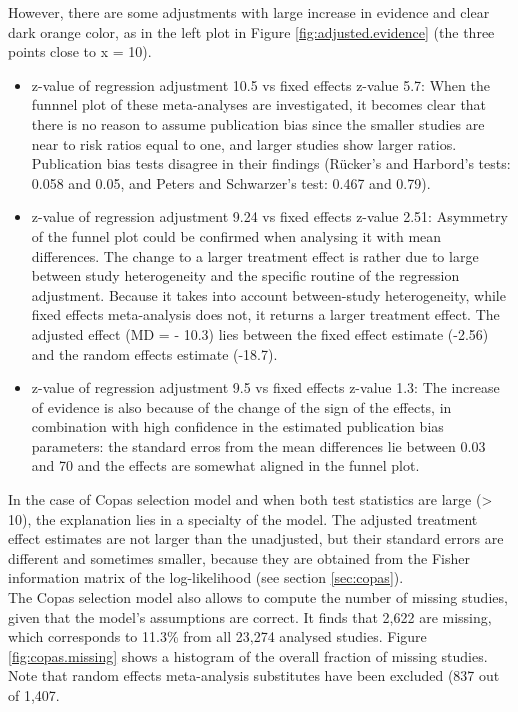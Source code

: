 \documentclass[11pt,a4paper,twoside]{book}\usepackage[]{graphicx}\usepackage[]{color}
\begin{document}
However, there are some adjustments with large increase in evidence and clear dark orange color, as in the left plot in Figure \ref{fig:adjusted.evidence} (the three points close to x = 10). 
\begin{itemize}
\item z-value of regression adjustment 10.5 vs fixed effects z-value 5.7: When the funnnel plot of these meta-analyses are investigated, it becomes clear that there is no reason to assume publication bias since the smaller studies are near to risk ratios equal to one, and larger studies show larger ratios. Publication bias tests disagree in their findings (R\"ucker's and Harbord's tests: 0.058 and 0.05, and Peters and Schwarzer's test: 0.467 and 0.79).
\item z-value of regression adjustment 9.24 vs fixed effects z-value 2.51: Asymmetry of the funnel plot could be confirmed when analysing it with mean differences. The change to a larger treatment effect is rather due to large between study heterogeneity and the specific routine of the regression adjustment. Because it takes into account between-study heterogeneity, while fixed effects meta-analysis does not, it returns a larger treatment effect. The adjusted effect (MD = - 10.3) lies between the fixed effect estimate (-2.56) and the random effects estimate (-18.7).
\item z-value of regression adjustment 9.5 vs fixed effects z-value 1.3: The increase of evidence is also because of the change of the sign of the effects, in combination with high confidence in the estimated publication bias parameters: the standard erros from the mean differences lie between 0.03 and 70 and the effects are somewhat aligned in the funnel plot. 
\end{itemize}
In the case of Copas selection model and when both test statistics are large (> 10), the explanation lies in a specialty of the model. The adjusted treatment effect estimates are not larger than the unadjusted, but their standard errors are different and sometimes smaller, because they are obtained from the Fisher information matrix of the log-likelihood (see section \ref{sec:copas}). \\
The Copas selection model also allows to compute the number of missing studies, given that the model's assumptions are correct. It finds that 2,622 are missing, which corresponds to 11.3\% from all 23,274 analysed studies. Figure \ref{fig:copas.missing} shows a histogram of the overall fraction of missing studies. Note that random effects meta-analysis substitutes have been excluded (837 out of 1,407.
\end{document}
